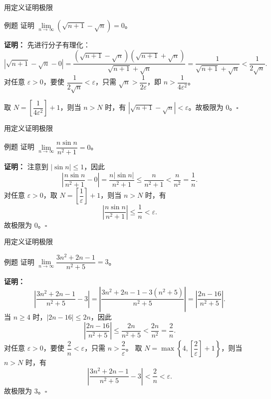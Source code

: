 \documentclass[aspectratio=169,10pt]{ctexbeamer}
\begin{document}
\begin{frame}{用定义证明极限}

  \begin{block}{例题}
   证明 \(\lim\limits_{n\to\infty} \left(\sqrt{n+1} - \sqrt{n}\right) = 0\)。
  \end{block}
  \pause
  \vspace{0.6cm}
  \textbf{证明：}
  先进行分子有理化：
  \[
  \left|\sqrt{n+1} - \sqrt{n} - 0\right| = \dfrac{(\sqrt{n+1} - \sqrt{n})(\sqrt{n+1} + \sqrt{n})}{\sqrt{n+1} + \sqrt{n}} = \dfrac{1}{\sqrt{n+1} + \sqrt{n}} < \dfrac{1}{2\sqrt{n}}.
  \]
  对任意 \(\varepsilon > 0\)，要使 \(\dfrac{1}{2\sqrt{n}} < \varepsilon\)，只需 \(\sqrt{n} > \dfrac{1}{2\varepsilon}\)，即 \(n > \dfrac{1}{4\varepsilon^2}\)。
  
  取 \(N = \left [ \dfrac{1}{4\varepsilon^2} \right] +1\)，则当 \(n > N\) 时，有 \(\left|\sqrt{n+1} - \sqrt{n}\right| < \varepsilon\)。故极限为 0。\(\square\)
\end{frame}

\begin{frame}{用定义证明极限}
  \small
  
  \begin{block}{例题}
    证明 \(\lim\limits_{n\to\infty} \dfrac{n \sin n}{n^2 + 1} = 0\)。
  \end{block}
  \pause
  \vspace{0.5cm}
  \textbf{证明：}
  注意到 \(|\sin n| \leq 1\)，因此
  \[
  \left|\dfrac{n \sin n}{n^2 + 1} - 0\right| = \dfrac{n |\sin n|}{n^2 + 1} \leq \dfrac{n}{n^2 + 1} < \dfrac{n}{n^2} = \dfrac{1}{n}.
  \]
  对任意 \(\varepsilon > 0\)，取 \(N = \left[\dfrac{1}{\varepsilon} \right]+1\)，则当 \(n > N\) 时，有
  \[
  \left|\dfrac{n \sin n}{n^2 + 1}\right| \leq \dfrac{1}{n} < \varepsilon.
  \]
  故极限为 0。\(\square\)
  

\end{frame}

\begin{frame}{用定义证明极限}

\begin{block}{例题}
	证明 \(\lim\limits_{n\to\infty} \dfrac{3n^2 + 2n - 1}{n^2 + 5} = 3\)。
\end{block}
\pause
\textbf{证明：}
\[
\left|\dfrac{3n^2 + 2n - 1}{n^2 + 5} - 3\right| = \left|\dfrac{3n^2 + 2n - 1 - 3(n^2 + 5)}{n^2 + 5}\right| = \left|\dfrac{2n - 16}{n^2 + 5}\right|.
\]
当 \(n \geq 4\) 时，\(|2n - 16| \leq 2n\)，因此
\[
\left|\dfrac{2n - 16}{n^2 + 5}\right| \leq \dfrac{2n}{n^2 + 5} < \dfrac{2n}{n^2} = \dfrac{2}{n}.
\]
对任意 \(\varepsilon > 0\)，要使 \(\dfrac{2}{n} < \varepsilon\)，只需 \(n > \dfrac{2}{\varepsilon}\)。
取 \(N = \max\left\{4, \left[ \dfrac{2}{\varepsilon} \right]+1\right\}\)，则当 \(n > N\) 时，有
\[
\left|\dfrac{3n^2 + 2n - 1}{n^2 + 5} - 3\right| < \dfrac{2}{n} < \varepsilon.
\]
故极限为 3。\(\square\)


\end{frame}
\end{document}
